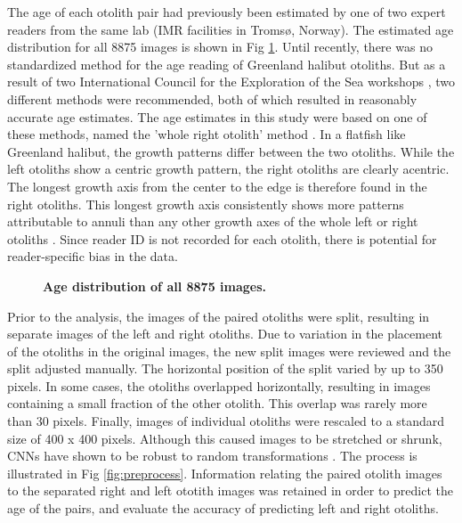 \documentclass[10pt,letterpaper]{article}
\begin{document}
The age of each otolith pair had previously been estimated by one of two expert readers from the same lab (IMR facilities in Tromsø, Norway). The estimated age distribution for all 8875 images is shown in Fig  \ref{fig:age}.  
Until recently, there was no standardized method for the age reading of Greenland halibut otoliths. But as a result of two International Council for the Exploration of the Sea workshops \citep{ices2011report,ices2017report}, two different methods were recommended, both of which resulted in reasonably accurate age estimates. The age estimates in this study were based on one of these methods, named the 'whole right otolith' method \citep{albert2009towards,albert2016growth,ices2017report}. In a flatfish like Greenland halibut, the growth patterns differ between the two otoliths. While the left otoliths show a centric growth pattern, the right otoliths are clearly acentric. The longest growth axis from the center to the edge is therefore found in the right otoliths. This longest growth axis consistently shows more patterns attributable to annuli than any other growth axes of the whole left or right otoliths \citep{albert2009towards,albert2016growth}. Since reader ID is not recorded for each otolith, there is potential for reader-specific bias in the data.

\begin{figure}[H]
  \centering
  \caption{\textbf{Age distribution of all 8875 images.}}
  \label{fig:age}
\end{figure}

Prior to the analysis, the images of the paired otoliths were split, resulting in separate images of the left and right otoliths. Due to variation in the placement of the otoliths in the original images, the new split images were reviewed and the split adjusted manually. The horizontal position of the split varied by up to 350 pixels. In some cases, the otoliths overlapped horizontally, resulting in images containing a small fraction of the other otolith. This overlap was rarely more than 30 pixels. Finally, images of individual otoliths were rescaled to a standard size of 400 x 400 pixels. Although this caused images to be stretched or shrunk, CNNs have shown to be robust to random transformations \citep{bengio1994globally,boureau2010theoretical}. The process is illustrated in Fig \ref{fig:preprocess}. Information relating the paired otolith images to the separated right and left ototith images was retained in order to predict the age of the pairs, and evaluate the accuracy of predicting left and right otoliths.  
\end{document}
